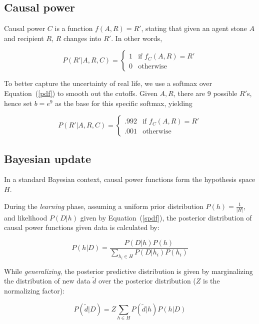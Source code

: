 \documentclass{article}
\begin{document}
\subsection*{Causal power}

Causal power $C$ is a function $f(A, R) = R'$, stating that given an agent stone $A$ and recipient $R$, $R$ changes into $R'$. In other words,

\begin{equation}\label{pdf}
	P(R'|A, R, C) =
	\begin{cases}
		1 &\text{if } f_C(A, R) = R'\\
		0 &\text{otherwise}
	\end{cases}
\end{equation}

To better capture the uncertainty of real life, we use a softmax over Equation~(\ref{pdf}) to smooth out the cutoffs. Given $A, R$, there are 9 possible $R'$s, hence set $b=e^9$ as the base for this specific softmax, yielding

\begin{equation}\label{spdf}
	P(R'|A, R, C) =
	\begin{cases}
		.992 &\text{if } f_C(A, R) = R'\\
		.001 &\text{otherwise}
	\end{cases}
\end{equation}

\subsection*{Bayesian update}

In a standard Bayesian context, causal power functions form the hypothesis space $H$. 

During the \emph{learning} phase, assuming a uniform prior distribution $P(h) = \frac{1}{|H|}$, and likelihood $P(D|h)$ given by Equation~(\ref{spdf}), the posterior distribution of causal power functions given data is calculated by:

\begin{equation}\label{learning}
	P(h|D) = \frac{P(D|h)P(h)}{\sum_{h_i \in H}P(D|h_i)P(h_i)}
\end{equation}	


While \emph{generalizing}, the posterior predictive distribution is given by marginalizing the distribution of new data $\tilde{d}$ over the posterior distribution ($Z$ is the normalizing factor):

\begin{equation}\label{gen}
	P(\tilde{d}|D) = Z \sum_{h\in H}P(\tilde{d}|h)P(h|D)
\end{equation}
\end{document}

